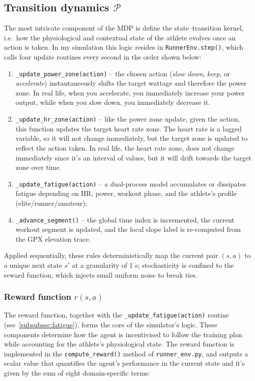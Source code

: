 \subsection{Transition dynamics \(\mathcal{P}\)}
The most intricate component of the MDP is define the state–transition kernel, i.e.\ how the physiological and contextual state of the athlete evolves once an action is taken. In my simulation this logic resides in \verb|RunnerEnv.step()|, which calls four update routines every second in the order shown below:

\begin{enumerate}
  \item \verb|_update_power_zone(action)| – the chosen action (\emph{slow down}, \emph{keep}, or \emph{accelerate}) instantaneously shifts the target wattage and therefore the power zone. In real life, when you accelerate, you immediately increase your power output, while when you slow down, you immediately decrease it. 
  \item \verb|_update_hr_zone(action)| – like the power zone update, given the action, this function updates the target heart rate zone. The heart rate is a lagged variable, so it will not change immediately, but the target zone is updated to reflect the action taken. In real life, the heart rate zone, does not change immediately since it's an interval of values, but it will drift towards the target zone over time.
  \item \verb|_update_fatigue(action)| – a dual-process model accumulates or dissipates fatigue depending on HR, power, workout phase, and the athlete's profile (elite/runner/amateur);
  \item \verb|_advance_segment()| – the global time index is incremented, the current workout segment is updated, and the local slope label is re-computed from the GPX elevation trace.  
\end{enumerate}

Applied sequentially, these rules deterministically map the current pair \((s,a)\) to a unique next state \(s'\) at a granularity of 1 s; stochasticity is confined to the reward function, which injects small uniform noise to break ties.

\subsubsection{Reward function \(r(s,a)\)}
The reward function, together with the \verb|_update_fatigue(action)| routine (see~\ref{subsubsec:fatigue}), forms the core of the simulator’s logic. These components determine how the agent is incentivised to follow the training plan while accounting for the athlete’s physiological state. The reward function is implemented in the \verb|compute_reward()| method of \verb|runner_env.py|, and outputs a scalar value that quantifies the agent’s performance in the current state and it's given by the sum of eight domain-specific terms:

